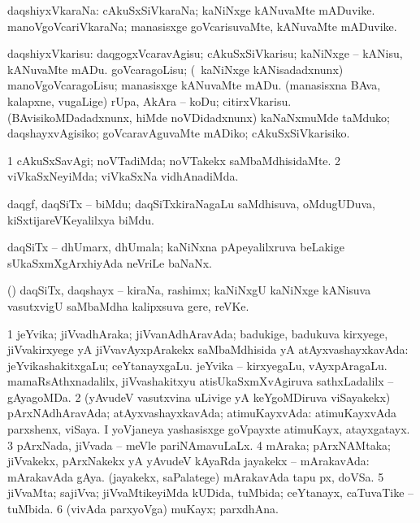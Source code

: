 \bentry
{} 
\gl{\nA}
\expl{}
\bmng
 daqshiyxVkaraNa: 
\banum
{} cAkuSxSiVkaraNa; kaNiNxge kANuvaMte mADuvike. 
 manoVgoVcariVkaraNa; manasisxge goVcarisuvaMte, kANuvaMte mADuvike. 
\eanum
\emng
\eentry

\bentry 
{} 
\gl{\sakirx}
\expl{}
\bmng
 daqshiyxVkarisu: 
\banum
{} daqgogxVcaravAgisu; cAkuSxSiVkarisu; kaNiNxge -- kANisu, kANuvaMte mADu. 
 goVcaragoLisu; (\kanmu\ kaNiNxge kANisadadxnunx) manoVgoVcaragoLisu; manasisxge kANuvaMte mADu. 
 (manasisxna BAva, kalapxne, \mo vugaLige) rUpa, AkAra -- koDu; citirxVkarisu. 
 (BAvisikoMDadadxnunx, hiMde noVDidadxnunx) kaNaNxmuMde taMduko; daqshayxvAgisiko; goVcaravAguvaMte mADiko; cAkuSxSiVkarisiko. 
\eanum
\emng
\eentry

\bentry
{} 
\gl{\kirxvi}
\expl{}
\bmng
\bnum
\num{1} cAkuSxSavAgi; noVTadiMda; noVTakekx saMbaMdhisidaMte. 
\num{2} viVkaSxNeyiMda; viVkaSxNa vidhAnadiMda. 
\enum
\emng
\eentry

\bentry 
{}
\gl{\nA}
\expl{}
\bmng
 daqgf, daqSiTx -- biMdu; daqSiTxkiraNagaLu saMdhisuva, oMdugUDuva, kiSxtijareVKeyalilxya biMdu. 
\emng
\eentry

\bentry 
{}
\gl{\nA}
\expl{}
\bmng
 daqSiTx -- dhUmarx, dhUmala; kaNiNxna pApeyalilxruva beLakige sUkaSxmXgArxhiyAda neVriLe baNaNx. 
\emng
\eentry

\bentry 
{}
\gl{\nA}
\expl{}
\bmng
 (\daqvi) daqSiTx, daqshayx -- kiraNa, rashimx; kaNiNxgU kaNiNxge kANisuva vasutxvigU saMbaMdha kalipxsuva gere, reVKe. 
\emng
\eentry

\bentry 
{} 
\gl{\gu}
\expl{}
\bmng
\bnum
\num{1} jeYvika; jiVvadhAraka; jiVvanAdhAravAda; badukige, badukuva kirxyege, jiVvakirxyege yA jiVvavAyxpArakekx saMbaMdhisida yA atAyxvashayxkavAda:  jeYvikashakitxgaLu; ceYtanayxgaLu.  jeYvika -- kirxyegaLu, vAyxpAragaLu.  mamaRsAthxnadalilx, jiVvashakitxyu atisUkaSxmXvAgiruva sathxLadalilx -- gAyagoMDa. 
\num{2} (yAvudeV vasutxvina uLivige yA keYgoMDiruva viSayakekx) pArxNAdhAravAda; atAyxvashayxkavAda; atimuKayxvAda:  atimuKayxvAda parxshenx, viSaya.  I yoVjaneya yashasisxge goVpayxte atimuKayx, atayxgatayx. 
\num{3} pArxNada, jiVvada -- meVle pariNAmavuLaLx. 
\num{4} mAraka; pArxNAMtaka; jiVvakekx, pArxNakekx yA yAvudeV kAyaRda jayakekx -- mArakavAda:  mArakavAda gAya.  (jayakekx, saPalatege) mArakavAda tapu px, doVSa. 
\num{5} jiVvaMta; sajiVva; jiVvaMtikeyiMda kUDida, tuMbida; ceYtanayx, caTuvaTike -- tuMbida. 
\num{6} (vivAda parxyoVga) muKayx; parxdhAna. 
\enum
\emng
\eentry

